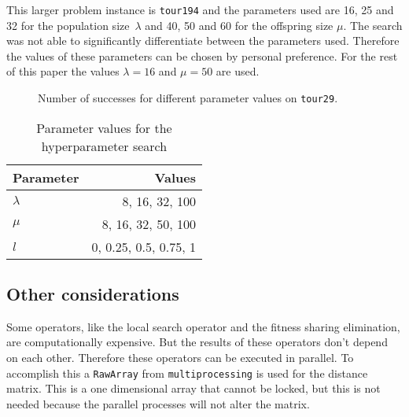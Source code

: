 \documentclass[a4paper,10pt]{article}
\newcommand{\ReplaceMe}[1]{{\color{blue}#1}}
\begin{document}
This larger problem instance is \texttt{tour194} and the parameters used are 16, 25 and 32 for the population size~$\lambda$ and 40, 50 and 60 for the offspring size $\mu$. The search was not able to significantly differentiate between the parameters used. Therefore the values of these parameters can be chosen by personal preference. For the rest of this paper the values $\lambda = 16$ and $\mu = 50$ are used.

\begin{figure}
\centering
\scalebox{.6}{}
\caption{Number of successes for different parameter values on \texttt{tour29}.}
\label{fig:hyperparameter}
\end{figure}

\begin{table}[]
\centering
\caption{Parameter values for the hyperparameter search}
\label{table:hyperparameter}
\begin{tabular}{|l|r|}
\hline
\rowcolor[HTML]{C0C0C0} 
Parameter & Values                       \\ \hline
$\lambda$ & 8, 16, 32, 100               \\ \hline
$\mu$     & 8, 16, 32, 50, 100      \\ \hline
$l$       & 0, 0.25, 0.5, 0.75, 1   \\ \hline
\end{tabular}
\end{table}

\subsection{Other considerations} \label{sec:other}


Some operators, like the local search operator and the fitness sharing elimination, are computationally expensive. But the results of these operators don't depend on each other. Therefore these operators can be executed in parallel. To accomplish this a \texttt{RawArray} from \texttt{multiprocessing} is used for the distance matrix. This is a one dimensional array that cannot be locked, but this is not needed because the parallel processes will not alter the matrix.\\
\end{document}

